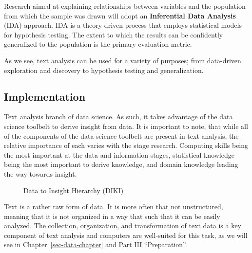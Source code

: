 \documentclass[
  letterpaper,
]{latex/krantz}
\theoremstyle{definition}
\theoremstyle{remark}
\begin{document}
Research aimed at explaining relationships between variables and the
population from which the sample was drawn will adopt an
\textbf{Inferential Data Analysis} (IDA) approach. IDA is a
theory-driven process that employs statistical models for hypothesis
testing. The extent to which the results can be confidently generalized
to the population is the primary evaluation metric.

As we see, text analysis can be used for a variety of purposes; from
data-driven exploration and discovery to hypothesis testing and
generalization.

\subsection{Implementation}\label{implementation}

Text analysis branch of data science. As such, it takes advantage of the
data science toolbelt to derive insight from data. It is important to
note, that while all of the components of the data science toolbelt are
present in text analysis, the relative importance of each varies with
the stage research. Computing skills being the most important at the
data and information stages, statistical knowledge being the most
important to derive knowledge, and domain knowledge leading the way
towards insight.

\begin{figure}[H]


\caption{\label{fig-diki-hierarchy}Data to Insight Hierarchy (DIKI)}

\end{figure}%

Text is a rather raw form of data. It is more often that not
unstructured, meaning that it is not organized in a way that such that
it can be easily analyzed. The collection, organization, and
transformation of text data is a key component of text analysis and
computers are well-suited for this task, as we will see in
Chapter~\ref{sec-data-chapter} and Part III ``Preparation''.
\end{document}
